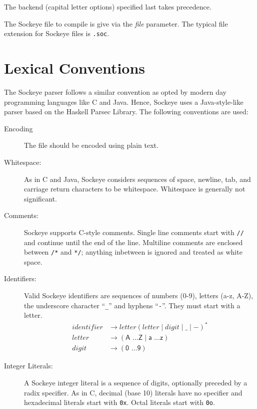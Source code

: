 \documentclass[a4paper,11pt,twoside]{report}
\begin{document}
{{The backend (capital letter options) specified last takes precedence.

The Sockeye file to compile is give via the \textit{file} parameter. The typical file extension for Sockeye files is \verb|.soc|.


\chapter{Lexical Conventions}
\label{chap:lexer}

The Sockeye parser follows a similar convention as opted by modern day 
programming languages like C and Java. Hence, Sockeye uses a Java-style-like
parser based on the Haskell Parsec Library. The following conventions are used:

\begin{description}
\item[Encoding] The file should be encoded using plain text.
\item[Whitespace:]  As in C and Java, Sockeye considers sequences of
  space, newline, tab, and carriage return characters to be
  whitespace.  Whitespace is generally not significant. 

\item[Comments:] Sockeye supports C-style comments.  Single line comments
  start with \texttt{//} and continue until the end of the line.
  Multiline comments are enclosed between \texttt{/*} and \texttt{*/};
  anything inbetween is ignored and treated as white space.

\item[Identifiers:] Valid Sockeye identifiers are sequences of numbers
  (0-9), letters (a-z, A-Z), the underscore character ``\texttt{\_}'' and hyphens ``\texttt{-}''. They
  must start with a letter.
  \begin{align*}
  identifier & \rightarrow letter (letter \mid digit \mid \_ \mid -)^{\textrm{*}} \\
  letter & \rightarrow (\textsf{A \ldots Z} \mid  \textsf{a \ldots z})\\
  digit & \rightarrow (\textsf{0 \ldots 9})
	\end{align*}
  
\item[Integer Literals:] A Sockeye integer literal is a sequence of
  digits, optionally preceded by a radix specifier.  As in C, decimal (base 10)
  literals have no specifier and hexadecimal literals start with
  \texttt{0x}. Octal literals start with \texttt{0o}.


\end{description}}}
\end{document}
